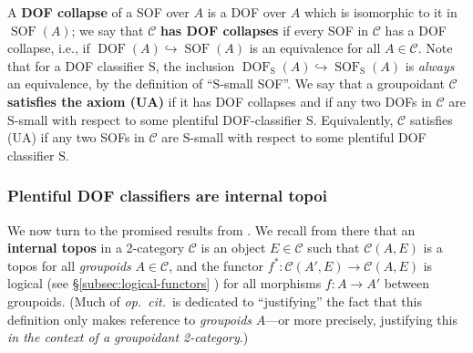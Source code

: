 \documentclass{amsart}
\newcommand\cC{\mathcal{C}}
\newcommand\defword[1]{{\boldmath \textbf{#1}}}
\newcommand\DOF{\operatorname{DOF}}
\newcommand\hto{\hookrightarrow}
\newcommand\opcitspace{\textit{op.~cit.}\ }
\newcommand\rS{\mathrm{S}}
\newcommand\SOF{\operatorname{SOF}}
\newcommand\prerefpost[3]{%
  \texorpdfstring%
    {\hyperref[#2]{#1\ref*{#2}#3}}%
    {#1\ref*{#2}#3}%
}
\newcommand\sref[1]{\prerefpost{\S}{#1}{}}
\theoremstyle{definition}
\theoremstyle{remark}
\theoremstyle{plainwithref}
\begin{document}
A \defword{DOF collapse} of a SOF over \( A \) is a DOF over \( A \) which is isomorphic to it in \( \SOF(A) \); we say that \( \cC \) \defword{has DOF collapses} if every SOF in \( \cC \) has a DOF collapse, i.e., if \( \DOF(A) \hto \SOF(A) \) is an equivalence for all \( A \in \cC \).
Note that for a DOF classifier \( \rS \), the inclusion \( \DOF_\rS(A) \hto \SOF_\rS(A) \) is \emph{always} an equivalence, by the definition of ``\( \rS \)-small SOF''.
We say that a groupoidant \( \cC \) \defword{satisfies the axiom (UA)} if it has DOF collapses and if any two DOFs in \( \cC \) are \( \rS \)-small with respect to some plentiful DOF-classifier \( \rS \).
Equivalently, \( \cC \) satisfies (UA) if any two SOFs in \( \cC \) are \( \rS \)-small with respect to some plentiful DOF classifier \( \rS \).

\subsubsection{Plentiful DOF classifiers are internal topoi} \label{subsubsec:dof-class-are-topoi}
We now turn to the promised results from \cite{helfer-topoi-in-topoi}.
We recall from there that an \defword{internal topos} in a 2-category \( \cC \) is an object \( E \in \cC \) such that \( \cC(A, E) \) is a topos for all \emph{groupoids} \( A \in \cC \), and the functor \( f^* \colon \cC(A', E) \to \cC(A, E) \) is logical (see \sref{subsec:logical-functors}) for all morphisms \( f \colon A \to A' \) between groupoids.
(Much of \opcitspace is dedicated to ``justifying'' the fact that this definition only makes reference to \emph{groupoids} \( A \)---or more precisely, justifying this \emph{in the context of a groupoidant 2-category}.)
\end{document}
